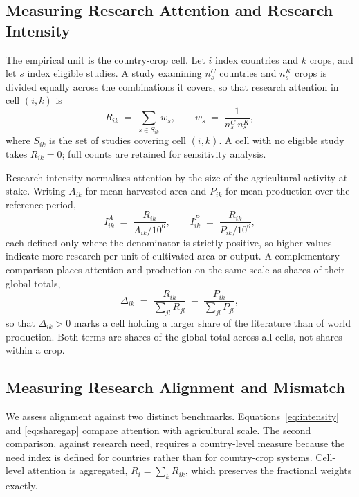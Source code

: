 \documentclass[ASNA,twocolumn]{USG}
\begin{document}
\subsection{Measuring Research Attention and Research Intensity}

The empirical unit is the country-crop cell. Let $i$ index countries and $k$ crops, and let
$s$ index eligible studies. A study examining $n^{C}_{s}$ countries and $n^{K}_{s}$ crops is
divided equally across the combinations it covers, so that research attention in cell $(i,k)$
is
\begin{equation}
R_{ik} \;=\; \sum_{s \in S_{ik}} w_{s},
\qquad
w_{s} \;=\; \frac{1}{n^{C}_{s}\, n^{K}_{s}},
\label{eq:frac}
\end{equation}
where $S_{ik}$ is the set of studies covering cell $(i,k)$. A cell with no eligible study takes $R_{ik}=0$; full counts are retained for sensitivity
analysis.

Research intensity normalises attention by the size of the agricultural activity at stake.
Writing $A_{ik}$ for mean harvested area and $P_{ik}$ for mean production over the reference
period,
\begin{equation}
I^{A}_{ik} \;=\; \frac{R_{ik}}{A_{ik}/10^{6}},
\qquad
I^{P}_{ik} \;=\; \frac{R_{ik}}{P_{ik}/10^{6}},
\label{eq:intensity}
\end{equation}
each defined only where the denominator is strictly positive, so higher values indicate more
research per unit of cultivated area or output. A complementary comparison places attention
and production on the same scale as shares of their global totals,
\begin{equation}
\Delta_{ik} \;=\; \frac{R_{ik}}{\sum_{jl} R_{jl}} \;-\; \frac{P_{ik}}{\sum_{jl} P_{jl}},
\label{eq:sharegap}
\end{equation}
so that $\Delta_{ik}>0$ marks a cell holding a larger share of the literature than of world
production. Both terms are shares of the global total across all cells, not shares within a
crop.

\subsection{Measuring Research Alignment and Mismatch}

We assess alignment against two distinct benchmarks. Equations~\eqref{eq:intensity} and
\eqref{eq:sharegap} compare attention with agricultural scale. The second comparison,
against research need, requires a country-level measure because the need index is defined for
countries rather than for country-crop systems. Cell-level attention is aggregated,
$R_{i}=\sum_{k} R_{ik}$, which preserves the fractional weights exactly.
\end{document}
